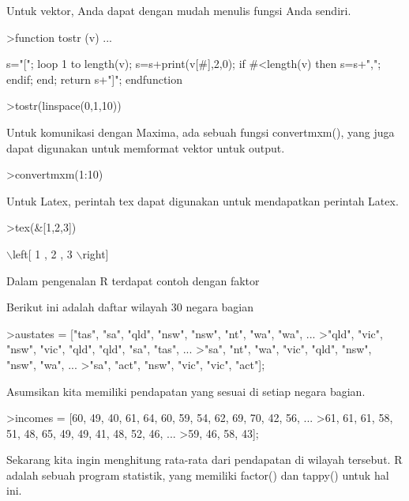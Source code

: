 \documentclass{article}
\begin{document}
\begin{eulernotebook}
\begin{eulercomment}
Untuk vektor, Anda dapat dengan mudah menulis fungsi Anda sendiri.
\end{eulercomment}
\begin{eulerprompt}
>function tostr (v) ...
\end{eulerprompt}
\begin{eulerudf}
  s="[";
  loop 1 to length(v);
     s=s+print(v[#],2,0);
     if #<length(v) then s=s+","; endif;
  end;
  return s+"]";
  endfunction
\end{eulerudf}
\begin{eulerprompt}
>tostr(linspace(0,1,10))
\end{eulerprompt}
\begin{euleroutput}
  [0.00,0.10,0.20,0.30,0.40,0.50,0.60,0.70,0.80,0.90,1.00]
\end{euleroutput}
\begin{eulercomment}
Untuk komunikasi dengan Maxima, ada sebuah fungsi convertmxm(), yang
juga dapat digunakan untuk memformat vektor untuk output.
\end{eulercomment}
\begin{eulerprompt}
>convertmxm(1:10)
\end{eulerprompt}
\begin{euleroutput}
  [1,2,3,4,5,6,7,8,9,10]
\end{euleroutput}
\begin{eulercomment}
Untuk Latex, perintah tex dapat digunakan untuk mendapatkan perintah
Latex.
\end{eulercomment}
\begin{eulerprompt}
>tex(&[1,2,3])
\end{eulerprompt}
\begin{euleroutput}
  \(\backslash\)left[ 1 , 2 , 3 \(\backslash\)right] 
\end{euleroutput}
\begin{eulercomment}
Dalam pengenalan R terdapat contoh dengan faktor

Berikut ini adalah daftar wilayah 30 negara bagian
\end{eulercomment}
\begin{eulerprompt}
>austates = ["tas", "sa", "qld", "nsw", "nsw", "nt", "wa", "wa", ...
>"qld", "vic", "nsw", "vic", "qld", "qld", "sa", "tas", ...
>"sa", "nt", "wa", "vic", "qld", "nsw", "nsw", "wa", ...
>"sa", "act", "nsw", "vic", "vic", "act"];
\end{eulerprompt}
\begin{eulercomment}
Asumsikan kita memiliki pendapatan yang sesuai di setiap negara
bagian.
\end{eulercomment}
\begin{eulerprompt}
>incomes = [60, 49, 40, 61, 64, 60, 59, 54, 62, 69, 70, 42, 56, ...
>61, 61, 61, 58, 51, 48, 65, 49, 49, 41, 48, 52, 46, ...
>59, 46, 58, 43];
\end{eulerprompt}
\begin{eulercomment}
Sekarang kita ingin menghitung rata-rata dari pendapatan di wilayah
tersebut. R adalah sebuah program statistik, yang memiliki factor()
dan tappy() untuk hal ini.


\end{eulercomment}
\end{eulernotebook}
\end{document}
